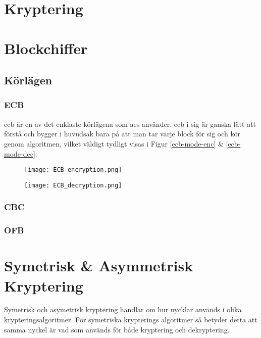 

\section{Kryptering}


\section{Blockchiffer}


\subsection{Körlägen}


\subsubsection{ECB}
\acrfull{ecb} är en av det enklaste körlägena som \acrshort{aes} använder.
\acrshort{ecb} i sig är ganska lätt att förstå och bygger i huvudsak bara på
att man tar varje block för sig och kör genom algoritmen, vilket väldigt
tydligt visas i Figur \ref{ecb-mode-enc} \& \ref{ecb-mode-dec}.

\begin{figure}[H]
    \texttt{[image: ECB\_encryption.png]}
    \label{fig:ecb-mode-enc}
\end{figure}

\begin{figure}[H]
    \texttt{[image: ECB\_decryption.png]}
    \label{fig:ecb-mode-dec}
\end{figure}

\subsubsection{CBC}


\subsubsection{OFB}


\section{Symetrisk \& Asymmetrisk Kryptering}
Symetrisk och asymetrisk kryptering handlar om hur nycklar används i olika
krypteringsalgoritmer. För symetriska krypterings algoritmer så betyder detta
att samma nyckel är vad som används för både kryptering och dekryptering.

